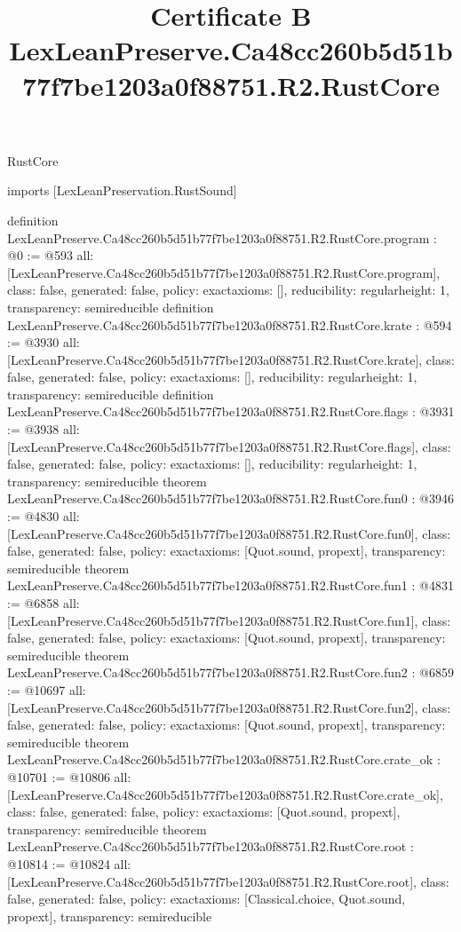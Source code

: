 \begin{lexlean}{RustCore}
\title{Certificate B LexLeanPreserve.Ca48cc260b5d51b77f7be1203a0f88751.R2.RustCore}
\begin{coremodule}
imports [LexLeanPreservation.RustSound]

definition LexLeanPreserve.Ca48cc260b5d51b77f7be1203a0f88751.R2.RustCore.program : @0 := @593 {
  all: [LexLeanPreserve.Ca48cc260b5d51b77f7be1203a0f88751.R2.RustCore.program],
  class: false,
  generated: false,
  policy: exact{axioms: []},
  reducibility: regular{height: 1},
  transparency: semireducible
}
definition LexLeanPreserve.Ca48cc260b5d51b77f7be1203a0f88751.R2.RustCore.krate : @594 := @3930 {
  all: [LexLeanPreserve.Ca48cc260b5d51b77f7be1203a0f88751.R2.RustCore.krate],
  class: false,
  generated: false,
  policy: exact{axioms: []},
  reducibility: regular{height: 1},
  transparency: semireducible
}
definition LexLeanPreserve.Ca48cc260b5d51b77f7be1203a0f88751.R2.RustCore.flags : @3931 := @3938 {
  all: [LexLeanPreserve.Ca48cc260b5d51b77f7be1203a0f88751.R2.RustCore.flags],
  class: false,
  generated: false,
  policy: exact{axioms: []},
  reducibility: regular{height: 1},
  transparency: semireducible
}
theorem LexLeanPreserve.Ca48cc260b5d51b77f7be1203a0f88751.R2.RustCore.fun0 : @3946 := @4830 {
  all: [LexLeanPreserve.Ca48cc260b5d51b77f7be1203a0f88751.R2.RustCore.fun0],
  class: false,
  generated: false,
  policy: exact{axioms: [Quot.sound, propext]},
  transparency: semireducible
}
theorem LexLeanPreserve.Ca48cc260b5d51b77f7be1203a0f88751.R2.RustCore.fun1 : @4831 := @6858 {
  all: [LexLeanPreserve.Ca48cc260b5d51b77f7be1203a0f88751.R2.RustCore.fun1],
  class: false,
  generated: false,
  policy: exact{axioms: [Quot.sound, propext]},
  transparency: semireducible
}
theorem LexLeanPreserve.Ca48cc260b5d51b77f7be1203a0f88751.R2.RustCore.fun2 : @6859 := @10697 {
  all: [LexLeanPreserve.Ca48cc260b5d51b77f7be1203a0f88751.R2.RustCore.fun2],
  class: false,
  generated: false,
  policy: exact{axioms: [Quot.sound, propext]},
  transparency: semireducible
}
theorem LexLeanPreserve.Ca48cc260b5d51b77f7be1203a0f88751.R2.RustCore.crate_ok : @10701 := @10806 {
  all: [LexLeanPreserve.Ca48cc260b5d51b77f7be1203a0f88751.R2.RustCore.crate_ok],
  class: false,
  generated: false,
  policy: exact{axioms: [Quot.sound, propext]},
  transparency: semireducible
}
theorem LexLeanPreserve.Ca48cc260b5d51b77f7be1203a0f88751.R2.RustCore.root : @10814 := @10824 {
  all: [LexLeanPreserve.Ca48cc260b5d51b77f7be1203a0f88751.R2.RustCore.root],
  class: false,
  generated: false,
  policy: exact{axioms: [Classical.choice, Quot.sound, propext]},
  transparency: semireducible
}


\end{coremodule}
\end{lexlean}
